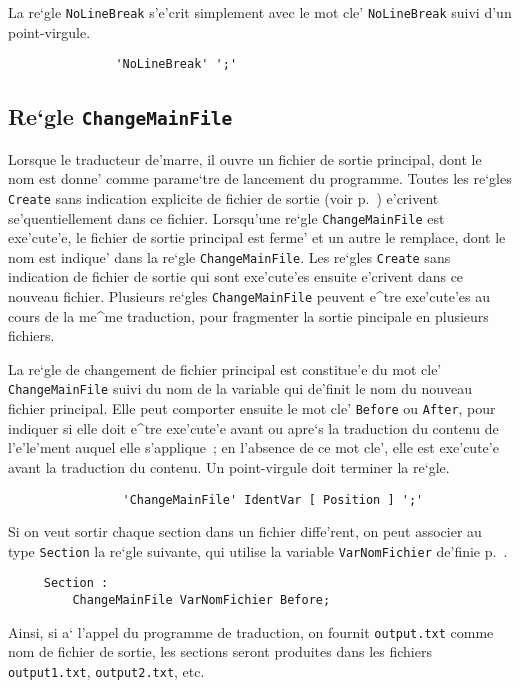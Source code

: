 {La re`gle {\tt NoLineBreak} s'e'crit
simplement avec le mot cle' {\tt NoLineBreak} suivi d'un point-virgule.

\begin{verbatim}
               'NoLineBreak' ';'
\end{verbatim}

\subsection{Re`gle {\tt ChangeMainFile}}
\label{changemainfile}

Lorsque le traducteur de'marre, il ouvre un fichier de sortie principal,
dont le nom est donne' comme parame`tre de lancement du programme.
Toutes les re`gles {\tt Create} sans indication explicite de fichier de
sortie (voir p.~\pageref{create}) e'crivent se'quentiellement dans ce
fichier. Lorsqu'une re`gle {\tt ChangeMainFile} est exe'cute'e,
le fichier de sortie principal est ferme' et un autre le remplace, dont
le nom est indique' dans la re`gle {\tt ChangeMainFile}. Les re`gles
{\tt Create} sans indication de fichier de sortie qui sont exe'cute'es
ensuite e'crivent dans ce nouveau fichier. Plusieurs re`gles
{\tt ChangeMainFile} peuvent e^tre exe'cute'es au cours de la me^me
traduction, pour fragmenter la sortie pincipale en plusieurs fichiers.

La re`gle de changement de fichier principal est constitue'e du mot cle'
{\tt ChangeMainFile} suivi du nom de la variable qui de'finit le nom
du nouveau fichier principal. Elle peut comporter ensuite le mot cle'
{\tt Before} ou {\tt After}, pour indiquer si elle doit e^tre exe'cute'e
avant ou apre`s la traduction du contenu de l'e'le'ment auquel elle
s'applique~; en l'absence de ce mot cle', elle est exe'cute'e avant
la traduction du contenu. Un point-virgule doit terminer la re`gle.

\begin{verbatim}
                'ChangeMainFile' IdentVar [ Position ] ';'
\end{verbatim}

\begin{example}
Si on veut sortir chaque section dans un fichier diffe'rent, on peut
associer au type {\tt Section} la re`gle suivante, qui utilise la
variable {\tt VarNomFichier} de'finie p.~\pageref{varnomfichier}.
\begin{verbatim}
     Section :
         ChangeMainFile VarNomFichier Before;
\end{verbatim}
Ainsi, si a` l'appel du programme de traduction, on fournit
{\tt output.txt} comme nom de fichier de sortie, les sections
seront produites dans les fichiers {\tt output1.txt},
{\tt output2.txt}, etc.
\end{example}

}
